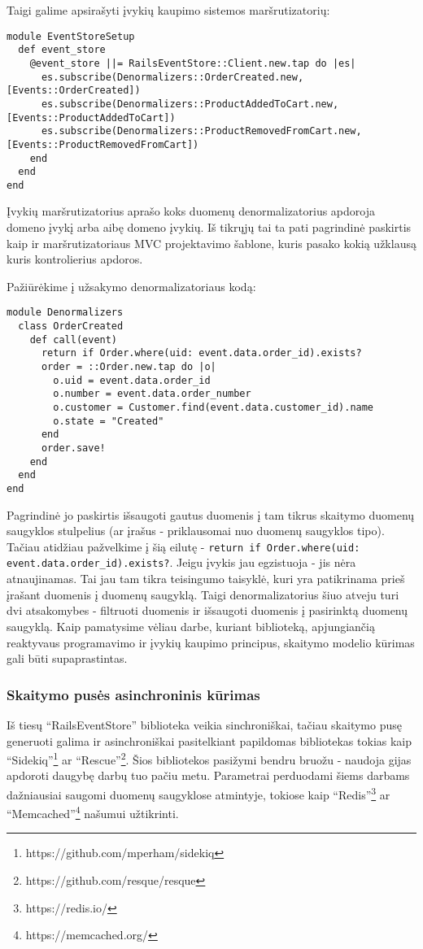 Taigi galime apsirašyti įvykių kaupimo sistemos maršrutizatorių:

\begin{lstlisting}
module EventStoreSetup
  def event_store
    @event_store ||= RailsEventStore::Client.new.tap do |es|
      es.subscribe(Denormalizers::OrderCreated.new, [Events::OrderCreated])
      es.subscribe(Denormalizers::ProductAddedToCart.new, [Events::ProductAddedToCart])
      es.subscribe(Denormalizers::ProductRemovedFromCart.new, [Events::ProductRemovedFromCart])
    end
  end
end
\end{lstlisting}

Įvykių maršrutizatorius aprašo koks duomenų denormalizatorius apdoroja domeno įvykį arba aibę domeno įvykių. Iš tikrųjų tai ta pati pagrindinė paskirtis kaip ir maršrutizatoriaus MVC projektavimo šablone, kuris pasako kokią užklausą kuris kontrolierius apdoros.

Pažiūrėkime į užsakymo denormalizatoriaus kodą:

\begin{lstlisting}
module Denormalizers
  class OrderCreated
    def call(event)
      return if Order.where(uid: event.data.order_id).exists?
      order = ::Order.new.tap do |o|
        o.uid = event.data.order_id
        o.number = event.data.order_number
        o.customer = Customer.find(event.data.customer_id).name
        o.state = "Created"
      end
      order.save!
    end
  end
end
\end{lstlisting}

Pagrindinė jo paskirtis išsaugoti gautus duomenis į tam tikrus skaitymo duomenų saugyklos stulpelius (ar įrašus - priklausomai nuo duomenų saugyklos tipo). Tačiau atidžiau pažvelkime į šią eilutę - \lstinline|return if Order.where(uid: event.data.order_id).exists?|. Jeigu įvykis jau egzistuoja - jis nėra atnaujinamas. Tai jau tam tikra teisingumo taisyklė, kuri yra patikrinama prieš įrašant duomenis į duomenų saugyklą. Taigi denormalizatorius šiuo atveju turi dvi atsakomybes - filtruoti duomenis ir išsaugoti duomenis į pasirinktą duomenų saugyklą. Kaip pamatysime vėliau darbe, kuriant biblioteką, apjungiančią reaktyvaus programavimo ir įvykių kaupimo principus, skaitymo modelio kūrimas gali būti supaprastintas.

\subsubsection{Skaitymo pusės asinchroninis kūrimas}

Iš tiesų ``RailsEventStore'' biblioteka veikia sinchroniškai, tačiau skaitymo pusę generuoti galima ir asinchroniškai pasitelkiant papildomas bibliotekas tokias kaip ``Sidekiq''\footnote{https://github.com/mperham/sidekiq} ar ``Rescue''\footnote{https://github.com/resque/resque}. Šios bibliotekos pasižymi bendru bruožu - naudoja gijas apdoroti daugybę darbų tuo pačiu metu. Parametrai perduodami šiems darbams dažniausiai saugomi duomenų saugyklose atmintyje, tokiose kaip ``Redis''\footnote{https://redis.io/} ar ``Memcached''\footnote{https://memcached.org/} našumui užtikrinti.

